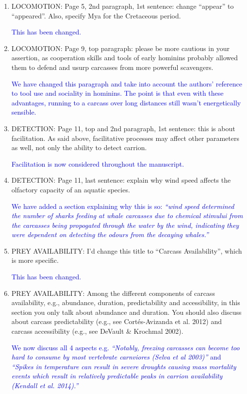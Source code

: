\documentclass[12pt,letterpaper]{article}
\begin{document}
\begin{enumerate}
\item{LOCOMOTION:} Page 5, 2nd paragraph, 1st sentence: change ``appear'' to ``appeared''. Also, specify Mya for the Cretaceous period.

\textcolor{blue}{This has been changed.}

\item{LOCOMOTION:} Page 9, top paragraph: please be more cautious in your assertion, as cooperation skills and tools of early hominins probably allowed them to defend and usurp carcasses from more powerful scavengers.

\textcolor{blue}{We have changed this paragraph and take into account the authors' reference to tool use and sociality in hominins. The point is that even with these advantages, running to a carcass over long distances still wasn't energetically sensible.}

\item{DETECTION:} Page 11, top and 2nd paragraph, 1st sentence: this is about facilitation. As said above, facilitative processes may affect other parameters as well, not only the ability to detect carrion.

\textcolor{blue}{Facilitation is now considered throughout the manuscript.}

\item{DETECTION:} Page 11, last sentence: explain why wind speed affects the olfactory capacity of an aquatic species.

\textcolor{blue}{We have added a section explaining why this is so: \textit{``wind speed determined the number of sharks feeding at whale carcasses due to chemical stimului from the carcasses being propogated through the water by the wind, indicating they were dependent on detecting the odours from the decaying whales.''}}

\item{PREY AVAILABILITY:} I'd change this title to ``Carcass Availability'', which is more specific.

\textcolor{blue}{This has been changed.}

\item{PREY AVAILABILITY:} Among the different components of carcass availability, e.g., abundance, duration, predictability and accessibility, in this section you only talk about abundance and duration. You should also discuss about carcass predictability (e.g., see Cort\'{e}s-Avizanda et al. 2012) and carcass accessibility (e.g., see DeVault \& Krochmal 2002).

\textcolor{blue}{We now discuss all 4 aspects e.g. \textit{``Notably, freezing carcasses can become too hard to consume by most vertebrate carnviores (Selva et al 2003)''} and \textit{``Spikes in temperature can result in severe droughts causing mass mortality events which result in relatively predictable peaks in carrion availability (Kendall et al. 2014).''}}



\end{enumerate}
\end{document}
